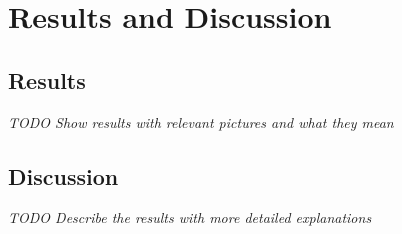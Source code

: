 
\chapter{Results and Discussion} %
\label{Chapter5}

\section{Results}
\textit{TODO Show results with relevant pictures and what they mean}

\lipsum[1-5]


\section{Discussion}
\textit{TODO Describe the results with more detailed explanations}

\lipsum[1-2]